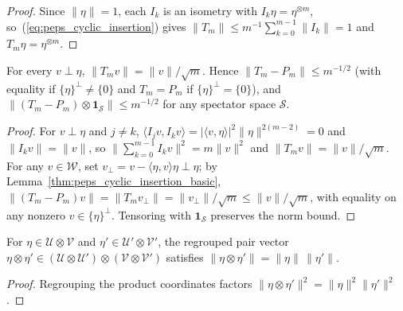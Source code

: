 \begin{proof}\leanok
    Since $\|\eta\|=1$, each $I_k$ is an isometry with $I_k\eta=\eta^{\otimes m}$,
    so~(\ref{eq:peps_cyclic_insertion}) gives
    $\|T_m\|\le m^{-1}\sum_{k=0}^{m-1}\|I_k\|=1$ and $T_m\eta=\eta^{\otimes m}$.
\end{proof}

\begin{lemma}
    \label{thm:peps_one_effect_estimate}
    \leanok
    For every $v\perp\eta$, $\|T_mv\|=\|v\|/\sqrt m$. Hence
    $\|T_m-P_m\|\le m^{-1/2}$ (with equality if $\{\eta\}^\perp\neq\{0\}$ and
    $T_m=P_m$ if $\{\eta\}^\perp=\{0\}$), and
    $\|(T_m-P_m)\otimes\mathbf 1_{\mathcal S}\|\le m^{-1/2}$ for any spectator
    space $\mathcal S$.
\end{lemma}

\begin{proof}\leanok
    For $v\perp\eta$ and $j\neq k$,
    $\langle I_jv,I_kv\rangle=|\langle v,\eta\rangle|^2\|\eta\|^{2(m-2)}=0$
    and $\|I_kv\|=\|v\|$, so $\|\sum_{k=0}^{m-1}I_kv\|^2=m\|v\|^2$ and
    $\|T_mv\|=\|v\|/\sqrt m$. For any $v\in\mathcal W$, set
    $v_\perp=v-\langle\eta,v\rangle\eta\perp\eta$; by
    Lemma~\ref{thm:peps_cyclic_insertion_basic},
    $\|(T_m-P_m)v\|=\|T_mv_\perp\|=\|v_\perp\|/\sqrt m\le\|v\|/\sqrt m$, with
    equality on any nonzero $v\in\{\eta\}^\perp$. Tensoring with
    $\mathbf 1_{\mathcal S}$ preserves the norm bound.
\end{proof}

\begin{lemma}
    \label{thm:peps_pair_combine}
    \leanok
    For $\eta\in\mathcal U\otimes\mathcal V$ and
    $\eta'\in\mathcal U'\otimes\mathcal V'$, the regrouped pair vector
    $\eta\otimes\eta'\in(\mathcal U\otimes\mathcal U')\otimes(\mathcal V\otimes\mathcal V')$
    satisfies $\|\eta\otimes\eta'\|=\|\eta\|\,\|\eta'\|$.
\end{lemma}

\begin{proof}\leanok
    Regrouping the product coordinates factors
    $\|\eta\otimes\eta'\|^2=\|\eta\|^2\|\eta'\|^2$.
\end{proof}
